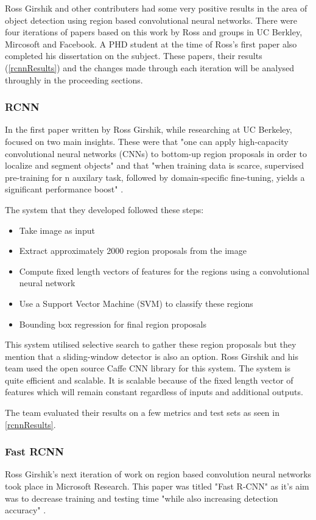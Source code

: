 Ross Girshik and other contributers had some very positive results in the area
of object detection using region based convolutional neural networks. There were
four iterations of papers based on this work by Ross and groups in UC Berkley,
Mircosoft and Facebook. A PHD student at the time of Ross's first paper also
completed his dissertation on the subject. These papers, their
results (\ref{rcnnResults}) and the changes made through each iteration will be analysed throughly in the proceeding sections.

\subsubsection*{RCNN}
In the first paper written by Ross Girshik, while researching at UC Berkeley,
focused on two main insights. These were that "one can apply high-capacity convolutional neural networks (CNNs) to bottom-up region proposals in order to localize and segment objects" and that
"when training data is scarce, supervised pre-training for n auxilary task,
followed by domain-specific fine-tuning, yields a significant performance boost"
\textcite{rcnn}.

The system that they developed followed these steps:
\begin{itemize}
    \item{Take image as input}
    \item{Extract approximately 2000 region proposals from the image}
    \item{Compute fixed length vectors of features for the regions using a convolutional
        neural network}
    \item{Use a Support Vector Machine (SVM) to classify these regions}
    \item{Bounding box regression for final region proposals}
\end{itemize}

This system utilised selective search to gather these region proposals but they
mention that a sliding-window detector is also an option. Ross Girshik and his
team used the open source Caffe CNN library for this system. The system is quite
efficient and scalable. It is scalable because of the fixed length vector of
features which will remain constant regardless of inputs and additional outputs.

The team evaluated their results on a few metrics and test sets as seen in
\ref{rcnnResults}.

\subsubsection*{Fast RCNN}
Ross Girshik's next iteration of work on region based convolution neural
networks took place in Microsoft Research. This paper was titled "Fast R-CNN" as
it's aim was to decrease training and testing time "while also increasing
detection accuracy" \textcite{fastRcnn}.

